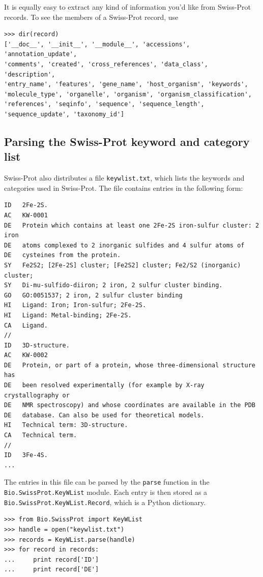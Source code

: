 \documentclass{report}
\begin{document}
It is equally easy to extract any kind of information you'd like from Swiss-Prot records. To see the members of a Swiss-Prot record, use
\begin{verbatim}
>>> dir(record)
['__doc__', '__init__', '__module__', 'accessions', 'annotation_update',
'comments', 'created', 'cross_references', 'data_class', 'description',
'entry_name', 'features', 'gene_name', 'host_organism', 'keywords',
'molecule_type', 'organelle', 'organism', 'organism_classification',
'references', 'seqinfo', 'sequence', 'sequence_length',
'sequence_update', 'taxonomy_id']
\end{verbatim}

\subsection{Parsing the Swiss-Prot keyword and category list}

Swiss-Prot also distributes a file \verb+keywlist.txt+, which lists the keywords and categories used in Swiss-Prot. The file contains entries in the following form:

\begin{verbatim}
ID   2Fe-2S.
AC   KW-0001
DE   Protein which contains at least one 2Fe-2S iron-sulfur cluster: 2 iron
DE   atoms complexed to 2 inorganic sulfides and 4 sulfur atoms of
DE   cysteines from the protein.
SY   Fe2S2; [2Fe-2S] cluster; [Fe2S2] cluster; Fe2/S2 (inorganic) cluster;
SY   Di-mu-sulfido-diiron; 2 iron, 2 sulfur cluster binding.
GO   GO:0051537; 2 iron, 2 sulfur cluster binding
HI   Ligand: Iron; Iron-sulfur; 2Fe-2S.
HI   Ligand: Metal-binding; 2Fe-2S.
CA   Ligand.
//
ID   3D-structure.
AC   KW-0002
DE   Protein, or part of a protein, whose three-dimensional structure has
DE   been resolved experimentally (for example by X-ray crystallography or
DE   NMR spectroscopy) and whose coordinates are available in the PDB
DE   database. Can also be used for theoretical models.
HI   Technical term: 3D-structure.
CA   Technical term.
//
ID   3Fe-4S.
...
\end{verbatim}

The entries in this file can be parsed by the \verb+parse+ function in the \verb+Bio.SwissProt.KeyWList+ module. Each entry is then stored as a \verb+Bio.SwissProt.KeyWList.Record+, which is a Python dictionary.

\begin{verbatim}
>>> from Bio.SwissProt import KeyWList
>>> handle = open("keywlist.txt")
>>> records = KeyWList.parse(handle)
>>> for record in records:
...     print record['ID']
...     print record['DE']
\end{verbatim}
\end{document}
